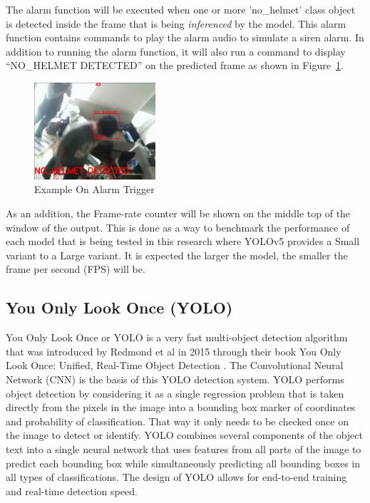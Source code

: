 \par The alarm function will be executed when one or more 'no\_helmet' 
class object is detected inside the frame that is being \emph{inferenced} by the model. 
This alarm function contains commands to play the alarm audio to simulate a siren alarm. 
In addition to running the alarm function, it will also run a command to display 
“NO\_HELMET DETECTED” on the predicted frame as shown in Figure~\ref{fig:alarmtriggerexample}.

\begin{figure} [ht]
  \centering
  \includegraphics[width=0.4\textwidth]{gambar/utilities/alarm_example.png}

  \caption{Example On Alarm Trigger}
  \label{fig:alarmtriggerexample}
\end{figure}

\par As an addition, the Frame-rate counter will be shown on the middle top of the window 
of the output. This is done as a way to benchmark the performance of each model that 
is being tested in this research where YOLOv5 provides a Small variant to a Large variant. 
It is expected the larger the model, the smaller the frame per second (FPS) will be.

\subsection{You Only Look Once (YOLO)}
\label{subsec:yolo_base}

\par You Only Look Once or YOLO is a very fast multi-object detection algorithm that was introduced by Redmond et al in 2015 through their book You Only Look Once: Unified, Real-Time Object Detection \cite{redmon2016you}. The Convolutional Neural Network (CNN) is the basis of this YOLO detection system. YOLO performs object detection by considering it as a single regression problem that is taken directly from the pixels in the image into a bounding box marker of coordinates and probability of classification. That way it only needs to be checked once on the image to detect or identify. \cite{redmon2016you} YOLO combines several components of the object text into a single neural network that uses features from all parts of the image to predict each bounding box while simultaneously predicting all bounding boxes in all types of classifications. The design of YOLO allows for end-to-end training and real-time detection speed.


